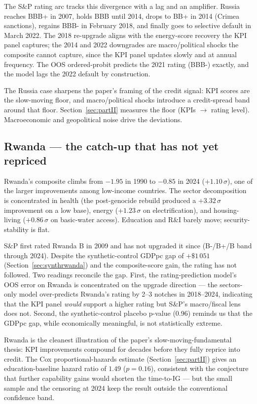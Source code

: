 The S\&P rating arc tracks this divergence with a lag and an amplifier. Russia reaches BBB+ in 2007, holds BBB until 2014, drops to BB+ in 2014 (Crimea sanctions), regains BBB- in February 2018, and finally goes to selective default in March 2022. The 2018 re-upgrade aligns with the energy-score recovery the KPI panel captures; the 2014 and 2022 downgrades are macro/political shocks the composite cannot capture, since the KPI panel updates slowly and at annual frequency. The OOS ordered-probit predicts the 2021 rating (BBB-) exactly, and the model lags the 2022 default by construction.

The Russia case sharpens the paper's framing of the credit signal: KPI scores are the slow-moving floor, and macro/political shocks introduce a credit-spread band around that floor. Section~\ref{sec:partII} measures the floor (KPIs $\to$ rating level). Macroeconomic and geopolitical noise drive the deviations.

\subsection{Rwanda --- the catch-up that has not yet repriced}

Rwanda's composite climbs from $-1.95$ in 1990 to $-0.85$ in 2024 ($+1.10\,\sigma$), one of the larger improvements among low-income countries. The sector decomposition is concentrated in health (the post-genocide rebuild produced a $+3.32\,\sigma$ improvement on a low base), energy ($+1.23\,\sigma$ on electrification), and housing-living ($+0.86\,\sigma$ on basic-water access). Education and R\&I barely move; security-stability is flat.

S\&P first rated Rwanda B in 2009 and has not upgraded it since (B-/B+/B band through 2024). Despite the synthetic-control GDPpc gap of $+\$1\,051$ (Section~\ref{sec:synthrwanda}) and the composite-score gain, the rating has not followed. Two readings reconcile the gap. First, the rating-prediction model's OOS error on Rwanda is concentrated on the upgrade direction --- the sectors-only model over-predicts Rwanda's rating by 2--3 notches in 2018--2024, indicating that the KPI panel \emph{would} support a higher rating but S\&P's macro/fiscal lens does not. Second, the synthetic-control placebo p-value (0.96) reminds us that the GDPpc gap, while economically meaningful, is not statistically extreme.

Rwanda is the cleanest illustration of the paper's slow-moving-fundamental thesis: KPI improvements compound for decades before they fully reprice into credit. The Cox proportional-hazards estimate (Section~\ref{sec:partII}) gives an education-baseline hazard ratio of $1.49$ ($p = 0.16$), consistent with the conjecture that further capability gains would shorten the time-to-IG --- but the small sample and the censoring at 2024 keep the result outside the conventional confidence band.
